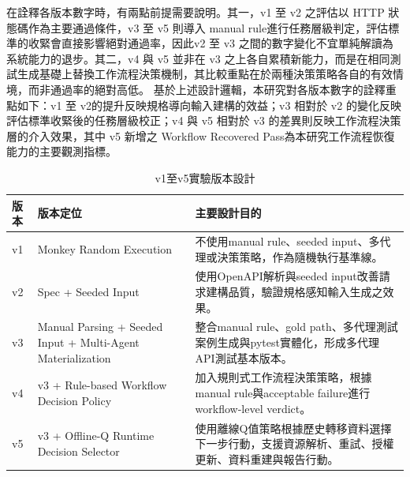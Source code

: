 \begin{ZhChapter}
\text 在詮釋各版本數字時，有兩點前提需要說明。其一，v1 至 v2 之評估以 HTTP 狀態碼作為主要通過條件，v3 至 v5 則導入 manual rule進行任務層級判定，評估標準的收緊會直接影響絕對通過率，因此v2 至 v3 之間的數字變化不宜單純解讀為系統能力的退步。其二，v4 與 v5 並非在 v3 之上各自累積新能力，而是在相同測試生成基礎上替換工作流程決策機制，其比較重點在於兩種決策策略各自的有效情境，而非通過率的絕對高低。
\text 基於上述設計邏輯，本研究對各版本數字的詮釋重點如下：v1 至 v2的提升反映規格導向輸入建構的效益；v3 相對於 v2 的變化反映評估標準收緊後的任務層級校正；v4 與 v5 相對於 v3 的差異則反映工作流程決策層的介入效果，其中 v5 新增之 Workflow Recovered Pass為本研究工作流程恢復能力的主要觀測指標。

\begin{table}[H]
    \centering
    \caption{v1至v5實驗版本設計}
    \label{tab:version_design_v1_v5}
    \scriptsize
    \renewcommand{\arraystretch}{1.4}
    \begin{tabularx}{\textwidth}{>{\centering\arraybackslash}p{0.8cm} >{\raggedright\arraybackslash}p{4.8cm} >{\raggedright\arraybackslash}X}
        \toprule
        \textbf{版本} & \textbf{版本定位} & \textbf{主要設計目的} \\
        \midrule
        v1 & Monkey Random Execution & 不使用manual rule、seeded input、多代理或決策策略，作為隨機執行基準線。 \\
        v2 & Spec + Seeded Input & 使用OpenAPI解析與seeded input改善請求建構品質，驗證規格感知輸入生成之效果。 \\
        v3 & Manual Parsing + Seeded Input + Multi-Agent Materialization & 整合manual rule、gold path、多代理測試案例生成與pytest實體化，形成多代理API測試基本版本。 \\
        v4 & v3 + Rule-based Workflow Decision Policy & 加入規則式工作流程決策策略，根據manual rule與acceptable failure進行workflow-level verdict。 \\
        v5 & v3 + Offline-Q Runtime Decision Selector & 使用離線Q值策略根據歷史轉移資料選擇下一步行動，支援資源解析、重試、授權更新、資料重建與報告行動。 \\
        \bottomrule
    \end{tabularx}
\end{table}


\end{ZhChapter}
